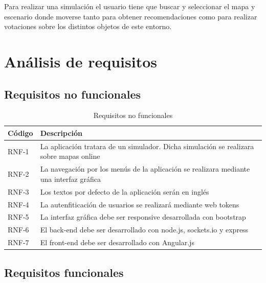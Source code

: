 Para realizar una simulación el usuario tiene que buscar y seleccionar el mapa y escenario donde moverse tanto para obtener recomendaciones como para realizar votaciones sobre los distintos objetos de este entorno.

\section{Análisis de requisitos}


\subsection{Requisitos no funcionales}


\begin{table}[H]
\begin{center}
\begin{tabular}{|p{1.5cm}| p{10.5cm}|}
\hline
Código & Descripción \\
\hline
RNF-1  & La aplicación tratara de un simulador. Dicha simulación se realizara sobre mapas online\\ \hline
RNF-2  & La navegación por los menús de la aplicación se realizara mediante una interfaz gráfica\\ \hline
RNF-3  & Los textos por defecto de la aplicación serán en inglés\\ \hline
RNF-4  & La autenfiticación de usuarios se realizará mediante web tokens\\ \hline
RNF-5  & La interfaz gráfica debe ser responsive desarrollada con bootstrap\\ \hline
RNF-6  & El back-end debe ser desarrollado con node.js, sockets.io y express \\ \hline
RNF-7  & El front-end debe ser desarrollado con Angular.js\\ \hline
\end{tabular}
\caption{Requisitos no funcionales}
\label{tabla:requisitosNoFuncionales}
\end{center}
\end{table}

\newpage

\subsection{Requisitos funcionales}


